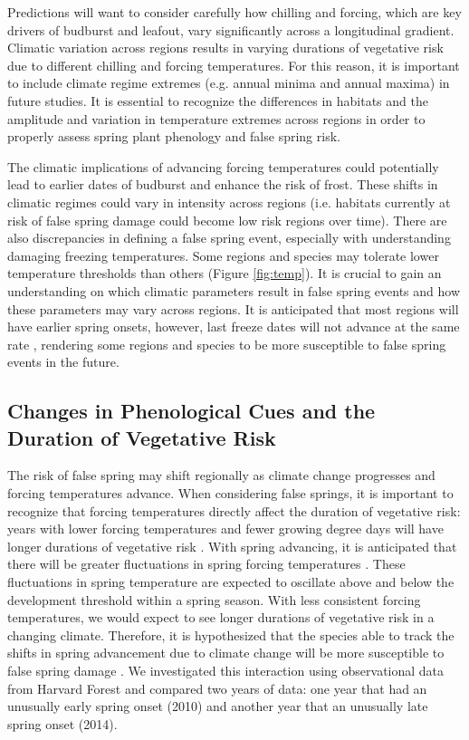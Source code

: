 \documentclass{article}\usepackage[]{graphicx}\usepackage[]{color}
\begin{document}
Predictions will want to consider carefully how chilling and forcing, which are key drivers of budburst and leafout, vary significantly across a longitudinal gradient. Climatic variation across regions results in varying durations of vegetative risk due to different chilling and forcing temperatures. For this reason, it is important to include climate regime extremes (e.g. annual minima and annual maxima) in future studies. It is essential to recognize the differences in habitats and the amplitude and variation in temperature extremes across regions in order to properly assess spring plant phenology and false spring risk. 

The climatic implications of advancing forcing temperatures could potentially lead to earlier dates of budburst and enhance the risk of frost. These shifts in climatic regimes could vary in intensity across regions (i.e. habitats currently at risk of false spring damage could become low risk regions over time). There are also discrepancies in defining a false spring event, especially with understanding damaging freezing temperatures. Some regions and species may tolerate lower temperature thresholds than others (Figure \ref{fig:temp}). It is crucial to gain an understanding on which climatic parameters result in false spring events and how these parameters may vary across regions. It is anticipated that most regions will have earlier spring onsets, however, last freeze dates will not advance at the same rate \citep{Inouye2008,Martin2010,Labe2016}, rendering some regions and species to be more susceptible to false spring events in the future. 

\subsection{Changes in Phenological Cues and the Duration of Vegetative Risk}
The risk of false spring may shift regionally as climate change progresses and forcing temperatures advance. When considering false springs, it is important to recognize that forcing temperatures directly affect the duration of vegetative risk: years with lower forcing temperatures and fewer growing degree days will have longer durations of vegetative risk \citep{Donnelly2017}. With spring advancing, it is anticipated that there will be greater fluctuations in spring forcing temperatures \citep{Martin2010}. These fluctuations in spring temperature are expected to oscillate above and below the development threshold within a spring season. With less consistent forcing temperatures, we would expect to see longer durations of vegetative risk in a changing climate. Therefore, it is hypothesized that the species able to track the shifts in spring advancement due to climate change will be more susceptible to false spring damage \citep{Scheifinger2003}. We investigated this interaction using observational data from Harvard Forest \citep{Okeefe2014} and compared two years of data: one year that had an unusually early spring onset (2010) and another year that an unusually late spring onset (2014).
\end{document}
